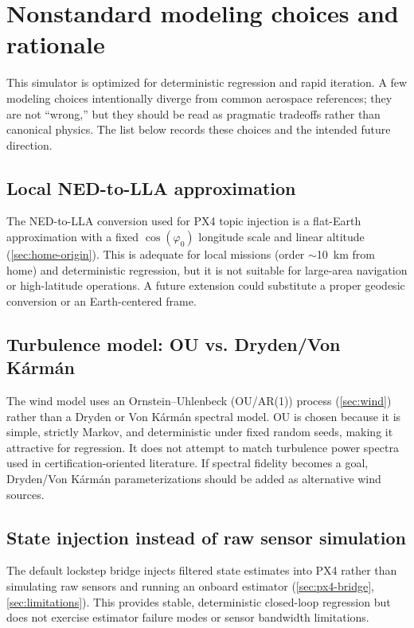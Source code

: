 \section{Nonstandard modeling choices and rationale}
\label{sec:design-choices}

This simulator is optimized for deterministic regression and rapid iteration. A few modeling choices intentionally diverge from common aerospace references; they are not ``wrong,'' but they should be read as pragmatic tradeoffs rather than canonical physics. The list below records these choices and the intended future direction.

\subsection{Local NED-to-LLA approximation}
The NED-to-LLA conversion used for PX4 topic injection is a flat-Earth approximation with a fixed \(\cos(\varphi_0)\) longitude scale and linear altitude (\cref{sec:home-origin}). This is adequate for local missions (order \(\sim\)\SI{10}{km} from home) and deterministic regression, but it is not suitable for large-area navigation or high-latitude operations. A future extension could substitute a proper geodesic conversion or an Earth-centered frame.

\subsection{Turbulence model: OU vs. Dryden/Von K\'arm\'an}
The wind model uses an Ornstein--Uhlenbeck (OU/AR(1)) process (\cref{sec:wind}) rather than a Dryden or Von K\'arm\'an spectral model. OU is chosen because it is simple, strictly Markov, and deterministic under fixed random seeds, making it attractive for regression. It does not attempt to match turbulence power spectra used in certification-oriented literature. If spectral fidelity becomes a goal, Dryden/Von K\'arm\'an parameterizations should be added as alternative wind sources.

\subsection{State injection instead of raw sensor simulation}
The default lockstep bridge injects filtered state estimates into PX4 rather than simulating raw sensors and running an onboard estimator (\cref{sec:px4-bridge}, \cref{sec:limitations}). This provides stable, deterministic closed-loop regression but does not exercise estimator failure modes or sensor bandwidth limitations.

